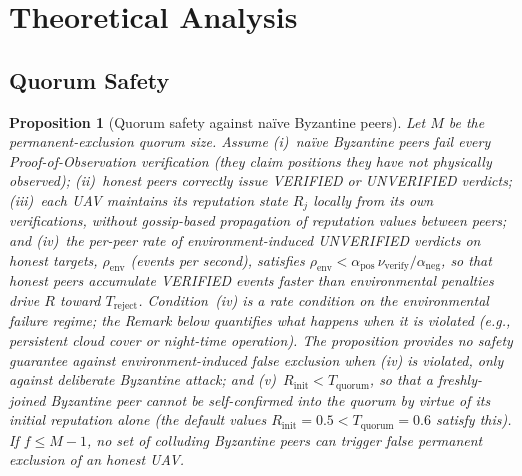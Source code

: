 \documentclass[conference,10pt]{IEEEtran}
\newtheorem{proposition}{Proposition}
\begin{document}
\section{Theoretical Analysis}
\label{sec:theory}

\subsection{Quorum Safety}
\label{sec:quorum-safety}

\begin{proposition}[Quorum safety against na\"ive Byzantine peers]
\label{prop:safety}
Let $M$ be the permanent-exclusion quorum size. Assume (i)~na\"ive Byzantine peers fail every Proof-of-Observation verification (they claim positions they have not physically observed); (ii)~honest peers correctly issue VERIFIED or UNVERIFIED verdicts; (iii)~each UAV maintains its reputation state $R_j$ locally from its own verifications, without gossip-based propagation of reputation values between peers; and (iv)~the per-peer rate of environment-induced UNVERIFIED verdicts on honest targets, $\rho_\text{env}$ (events per second), satisfies $\rho_\text{env} < \alpha_\text{pos}\, \nu_\text{verify}/\alpha_\text{neg}$, so that honest peers accumulate VERIFIED events faster than environmental penalties drive $R$ toward $T_\text{reject}$. Condition~(iv) is a \emph{rate condition on the environmental failure regime}; the Remark below quantifies what happens when it is violated (e.g., persistent cloud cover or night-time operation). The proposition provides no safety guarantee against environment-induced false exclusion when (iv) is violated, only against deliberate Byzantine attack; and (v)~$R_\text{init} < T_\text{quorum}$, so that a freshly-joined Byzantine peer cannot be self-confirmed into the quorum by virtue of its initial reputation alone (the default values $R_\text{init}=0.5 < T_\text{quorum}=0.6$ satisfy this). If $f \leq M-1$, no set of colluding Byzantine peers can trigger false permanent exclusion of an honest UAV.
\end{proposition}
\end{document}

